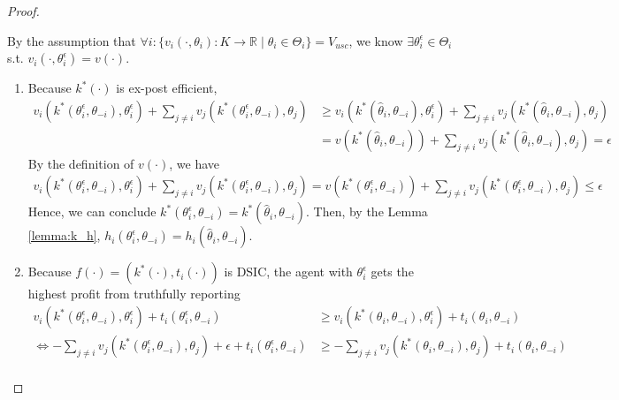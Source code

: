 \documentclass[11pt]{elegantbook}
\begin{document}
\begin{proof}
\begin{enumerate}
        By the assumption that $\forall i: \{v_i(\cdot,\theta_i): K \rightarrow \mathbb{R}\mid \theta_i\in\Theta_i\}=V_{usc}$, we know $\exists \theta^\epsilon_i\in\Theta_i$ s.t. $v_i(\cdot,\theta^\epsilon_i)=v(\cdot)$.
        \begin{enumerate}[$\circ$]
            \item Because $k^*(\cdot)$ is ex-post efficient,
            \begin{equation}
                \begin{aligned}
                    v_i(k^*(\theta^\epsilon_i,\theta_{-i}),\theta^\epsilon_i)+\sum_{j\neq i} v_j(k^*(\theta^\epsilon_i,\theta_{-i}),\theta_j)&\geq v_i(k^*(\hat{\theta}_i,\theta_{-i}),\theta^\epsilon_i)+\sum_{j\neq i} v_j(k^*(\hat{\theta}_i,\theta_{-i}),\theta_j)\\
                    &=v(k^*(\hat{\theta}_i,\theta_{-i}))+\sum_{j\neq i} v_j(k^*(\hat{\theta}_i,\theta_{-i}),\theta_j)=\epsilon
                \end{aligned}
                \nonumber
            \end{equation}
            By the definition of $v(\cdot)$, we have
            \begin{equation}
                \begin{aligned}
                    v_i(k^*(\theta^\epsilon_i,\theta_{-i}),\theta^\epsilon_i)+\sum_{j\neq i} v_j(k^*(\theta^\epsilon_i,\theta_{-i}),\theta_j)=v(k^*(\theta^\epsilon_i,\theta_{-i}))+\sum_{j\neq i} v_j(k^*(\theta^\epsilon_i,\theta_{-i}),\theta_j)\leq \epsilon
                \end{aligned}
                \nonumber
            \end{equation}
            Hence, we can conclude $k^*(\theta^\epsilon_i,\theta_{-i})=k^*(\hat{\theta}_i,\theta_{-i})$. Then, by the Lemma \ref{lemma:k_h}, $h_i(\theta^\epsilon_i,\theta_{-i})=h_i(\hat{\theta}_i,\theta_{-i})$.
            \item Because $f(\cdot)=\left(k^*(\cdot),t_i(\cdot)\right)$ is DSIC, the agent with $\theta^\epsilon_i$ gets the highest profit from truthfully reporting
            \begin{equation}
                \begin{aligned}
                    v_i(k^*(\theta^\epsilon_i,\theta_{-i}),\theta^\epsilon_i)+t_i(\theta^\epsilon_i,\theta_{-i})&\geq v_i(k^*(\theta_i,\theta_{-i}),\theta^\epsilon_i)+t_i(\theta_i,\theta_{-i})\\
                    \Leftrightarrow -\sum_{j\neq i}v_j(k^*(\theta^\epsilon_i,\theta_{-i}),\theta_j)+\epsilon+t_i(\theta^\epsilon_i,\theta_{-i})&\geq-\sum_{j\neq i}v_j(k^*(\theta_i,\theta_{-i}),\theta_j)+t_i(\theta_i,\theta_{-i})\\

\end{aligned}
\end{equation}
\end{enumerate}
\end{enumerate}
\end{proof}
\end{document}
